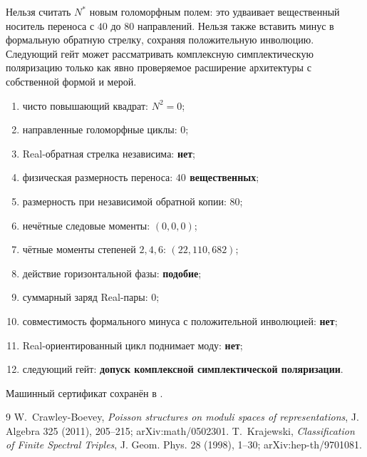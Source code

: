 \begin{nogocriterion}
Нельзя считать $N^*$ новым голоморфным полем: это удваивает вещественный
носитель переноса с $40$ до $80$ направлений. Нельзя также вставить минус
в формальную обратную стрелку, сохраняя положительную инволюцию. Следующий
гейт может рассматривать комплексную симплектическую поляризацию только как
явно проверяемое расширение архитектуры с собственной формой и мерой.
\end{nogocriterion}

\begin{protocol}
\begin{enumerate}
 \item чисто повышающий квадрат: \textbf{$N^2=0$};
 \item направленные голоморфные циклы: \textbf{$0$};
 \item Real-обратная стрелка независима: \textbf{нет};
 \item физическая размерность переноса: \textbf{$40$ вещественных};
 \item размерность при независимой обратной копии: \textbf{$80$};
 \item нечётные следовые моменты: \textbf{$(0,0,0)$};
 \item чётные моменты степеней $2,4,6$: \textbf{$(22,110,682)$};
 \item действие горизонтальной фазы: \textbf{подобие};
 \item суммарный заряд Real-пары: \textbf{$0$};
 \item совместимость формального минуса с положительной инволюцией:
 \textbf{нет};
 \item Real-ориентированный цикл поднимает моду: \textbf{нет};
 \item следующий гейт: \textbf{допуск комплексной симплектической
 поляризации}.
\end{enumerate}
\end{protocol}

Машинный сертификат сохранён в
.

\begin{thebibliography}{9}
W.~Crawley-Boevey,
\emph{Poisson structures on moduli spaces of representations},
J. Algebra 325 (2011), 205--215; arXiv:math/0502301.
T.~Krajewski, \emph{Classification of Finite Spectral Triples},
J. Geom. Phys. 28 (1998), 1--30; arXiv:hep-th/9701081.
\end{thebibliography}